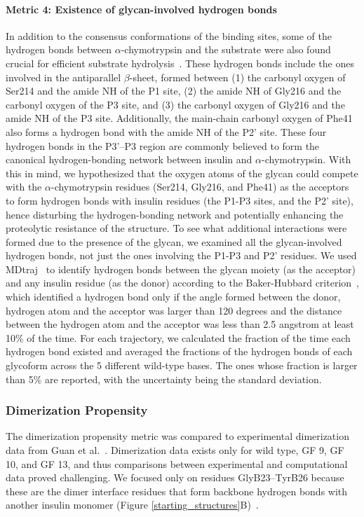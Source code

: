 \documentclass[sn-vancouver]{sn-jnl}
\begin{document}
\paragraph{Metric 4: Existence of glycan-involved hydrogen bonds}
In addition to the consensus conformations of the binding sites, some of the hydrogen bonds between $\alpha$-chymotrypsin and the substrate were also found crucial for efficient substrate hydrolysis~\cite{hedstrom2002serine}. These hydrogen bonds include the ones involved in the antiparallel $\beta$-sheet, formed between (1) the carbonyl oxygen of Ser214 and the amide NH of the P1 site, (2) the amide NH of Gly216 and the carbonyl oxygen of the P3 site, and (3) the carbonyl oxygen of Gly216 and the amide  NH of the P3 site. Additionally, the main-chain carbonyl oxygen of Phe41 also forms a hydrogen bond with the amide NH of the P2' site. These four hydrogen bonds in the P3'--P3 region are commonly believed to form the canonical hydrogen-bonding network between insulin and $\alpha$-chymotrypsin. With this in mind, we hypothesized that the oxygen atoms of the glycan could compete with the $\alpha$-chymotrypsin residues (Ser214, Gly216, and Phe41) as the acceptors to form hydrogen bonds with insulin residues (the P1-P3 sites, and the P2' site), hence disturbing the hydrogen-bonding network and potentially enhancing the proteolytic resistance of the structure. To see what additional interactions were formed due to the presence of the glycan, we examined all the glycan-involved hydrogen bonds, not just the ones involving the P1-P3 and P2' residues. We used MDtraj~\cite{mcgibbon2015mdtraj} to identify hydrogen bonds between the glycan moiety (as the acceptor) and any insulin residue (as the donor) according to the Baker-Hubbard criterion~\cite{baker1984hydrogen}, which identified a hydrogen bond only if the angle formed between the donor, hydrogen atom and the acceptor was larger than 120 degrees and the distance between the hydrogen atom and the acceptor was less than 2.5 angstrom at least 10\% of the time. For each trajectory, we calculated the fraction of the time each hydrogen bond existed and averaged the fractions of the hydrogen bonds of each glycoform across the 5 different wild-type bases. The ones whose fraction is larger than 5\% are reported, with the uncertainty being the standard deviation.

\subsubsection{Dimerization Propensity}
The dimerization propensity metric was compared to experimental dimerization data from Guan et al.~\cite{guan2018chemically}. Dimerization data exists only for wild type, GF 9, GF 10, and GF 13, and thus comparisons between experimental and computational data proved challenging. We focused only on residues GlyB23--TyrB26 because these are the dimer interface residues that form backbone hydrogen bonds with another insulin monomer (Figure \ref{starting_structures}B)~\cite{timofeev2010x, harding1966crystal, antolikova2011dimerinterface}. 
\end{document}
